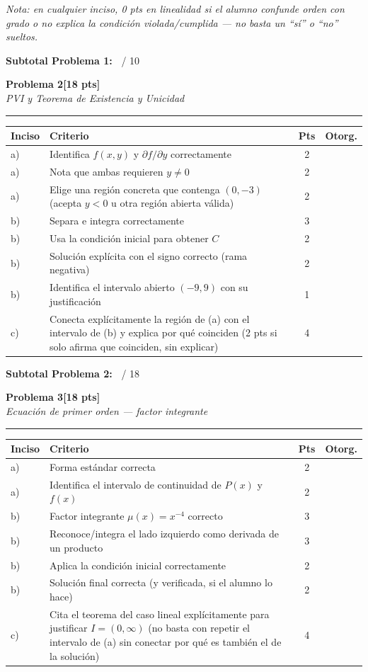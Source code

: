 \documentclass[11pt,letterpaper]{article}
\makeatletter
\newcommand{\problema}[3]{%
  \bigskip\bigskip\noindent
  {\Large\textbf{Problema #1}}\hfill\textbf{[#2 pts]}\\[3pt]
  {\small\itshape #3}\par
  \vspace{2pt}\hrule\vspace{8pt}
}
\newenvironment{tablarubrica}{%
  \begin{tabular}{@{}p{1.1cm}Lcc@{}}
  \toprule
  \textbf{Inciso} & \textbf{Criterio} & \textbf{Pts} & \textbf{Otorg.} \\
  \midrule
}{%
  \bottomrule
  \end{tabular}
}
\makeatother
\begin{document}
\textit{Nota: en cualquier inciso, 0 pts en linealidad si el alumno confunde orden con grado o no explica la condición violada/cumplida — no basta un ``sí'' o ``no'' sueltos.}

\medskip
\noindent\textbf{Subtotal Problema 1:\ } \underline{\hspace{2.5cm}} / 10

\newpage
\problema{2}{18}{PVI y Teorema de Existencia y Unicidad}

\begin{tablarubrica}
a) & Identifica $f(x,y)$ y $\partial f/\partial y$ correctamente & 2 & \\
a) & Nota que ambas requieren $y\neq0$ & 2 & \\
a) & Elige una región concreta que contenga $(0,-3)$ (acepta $y<0$ u otra región abierta válida) & 2 & \\
b) & Separa e integra correctamente & 3 & \\
b) & Usa la condición inicial para obtener $C$ & 2 & \\
b) & Solución explícita con el signo correcto (rama negativa) & 2 & \\
b) & Identifica el intervalo abierto $(-9,9)$ con su justificación & 1 & \\
c) & Conecta explícitamente la región de (a) con el intervalo de (b) y explica por qué coinciden (2 pts si solo afirma que coinciden, sin explicar) & 4 & \\
\end{tablarubrica}

\medskip
\noindent\textbf{Subtotal Problema 2:\ } \underline{\hspace{2.5cm}} / 18

\problema{3}{18}{Ecuación de primer orden --- factor integrante}

\begin{tablarubrica}
a) & Forma estándar correcta & 2 & \\
a) & Identifica el intervalo de continuidad de $P(x)$ y $f(x)$ & 2 & \\
b) & Factor integrante $\mu(x)=x^{-4}$ correcto & 3 & \\
b) & Reconoce/integra el lado izquierdo como derivada de un producto & 3 & \\
b) & Aplica la condición inicial correctamente & 2 & \\
b) & Solución final correcta (y verificada, si el alumno lo hace) & 2 & \\
c) & Cita el teorema del caso lineal explícitamente para justificar $I=(0,\infty)$ (no basta con repetir el intervalo de (a) sin conectar por qué es también el de la solución) & 4 & \\
\end{tablarubrica}
\end{document}
